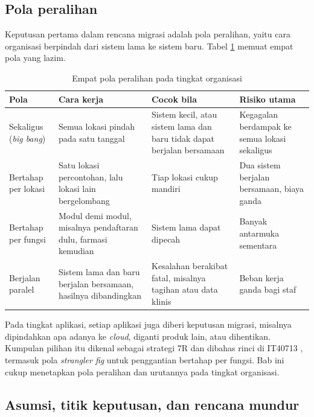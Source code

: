 \subsection*{Pola peralihan}

Keputusan pertama dalam rencana migrasi adalah pola peralihan, yaitu cara
organisasi berpindah dari sistem lama ke sistem baru. Tabel \ref{tab:ch12-pola}
memuat empat pola yang lazim.

\begin{table}[!htb]
  \centering
  \caption{Empat pola peralihan pada tingkat organisasi}
  \label{tab:ch12-pola}
  \begin{tabularx}{\textwidth}{>{\raggedright\arraybackslash}p{2.0cm}
                               >{\raggedright\arraybackslash}X
                               >{\raggedright\arraybackslash}X
                               >{\raggedright\arraybackslash}X}
    \hline
    \textbf{Pola} & \textbf{Cara kerja} & \textbf{Cocok bila} &
      \textbf{Risiko utama} \\
    \hline
    Sekaligus (\textit{big bang}) & Semua lokasi pindah pada satu tanggal &
      Sistem kecil, atau sistem lama dan baru tidak dapat berjalan bersamaan &
      Kegagalan berdampak ke semua lokasi sekaligus \\
    \hline
    Bertahap per lokasi & Satu lokasi percontohan, lalu lokasi lain bergelombang &
      Tiap lokasi cukup mandiri & Dua sistem berjalan bersamaan, biaya ganda \\
    \hline
    Bertahap per fungsi & Modul demi modul, misalnya pendaftaran dulu, farmasi
      kemudian & Sistem lama dapat dipecah & Banyak antarmuka sementara \\
    \hline
    Berjalan paralel & Sistem lama dan baru berjalan bersamaan, hasilnya
      dibandingkan & Kesalahan berakibat fatal, misalnya tagihan atau data
      klinis & Beban kerja ganda bagi staf \\
    \hline
  \end{tabularx}
\end{table}

Pada tingkat aplikasi, setiap aplikasi juga diberi keputusan migrasi, misalnya
dipindahkan apa adanya ke \textit{cloud}, diganti produk lain, atau dihentikan.
Kumpulan pilihan itu dikenal sebagai strategi 7R dan dibahas rinci di IT40713
\cite{c12-aws-7r}, termasuk pola \textit{strangler fig} untuk penggantian
bertahap per fungsi. Bab ini cukup menetapkan pola peralihan dan urutannya pada
tingkat organisasi.

\subsection*{Asumsi, titik keputusan, dan rencana mundur}

